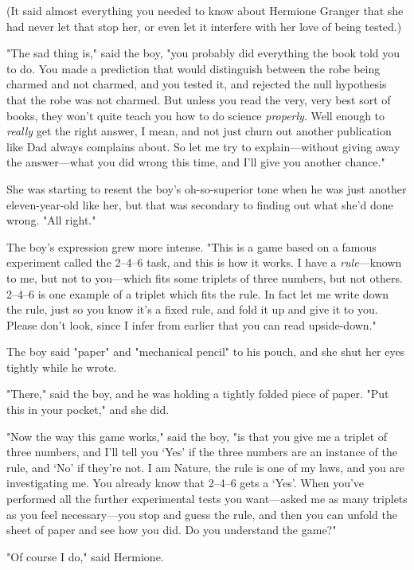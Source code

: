(It said almost everything you needed to know about Hermione Granger that she
had never let that stop her, or even let it interfere with her love of being
tested.)

"The sad thing is," said the boy, "you probably did everything the book told
you to do. You made a prediction that would distinguish between the robe being
charmed and not charmed, and you tested it, and rejected the null hypothesis
that the robe was not charmed. But unless you read the very, very best sort of
books, they won't quite teach you how to do science \emph{properly}. Well
enough to \emph{really} get the right answer, I mean, and not just churn out
another publication like Dad always complains about. So let me try to
explain---without giving away the answer---what you did wrong this time, and
I'll give you another chance."

She was starting to resent the boy's oh-so-superior tone when he was just
another eleven-year-old like her, but that was secondary to finding out what
she'd done wrong. "All right."

The boy's expression grew more intense. "This is a game based on a famous
experiment called the 2--4--6 task, and this is how it works. I have a
\emph{rule}---known to me, but not to you---which fits some triplets of three
numbers, but not others. 2--4--6 is one example of a triplet which fits the rule.
In fact{\el} let me write down the rule, just so you know it's a fixed rule,
and fold it up and give it to you. Please don't look, since I infer from
earlier that you can read upside-down."

The boy said "paper" and "mechanical pencil" to his pouch, and she shut her
eyes tightly while he wrote.

"There," said the boy, and he was holding a tightly folded piece of paper. "Put
this in your pocket," and she did.

"Now the way this game works," said the boy, "is that you give me a triplet of
three numbers, and I'll tell you `Yes' if the three numbers are an instance of
the rule, and `No' if they're not. I am Nature, the rule is one of my laws, and
you are investigating me. You already know that 2--4--6 gets a `Yes'. When you've
performed all the further experimental tests you want---asked me as many
triplets as you feel necessary---you stop and guess the rule, and then you can
unfold the sheet of paper and see how you did. Do you understand the game?"

"Of course I do," said Hermione.

